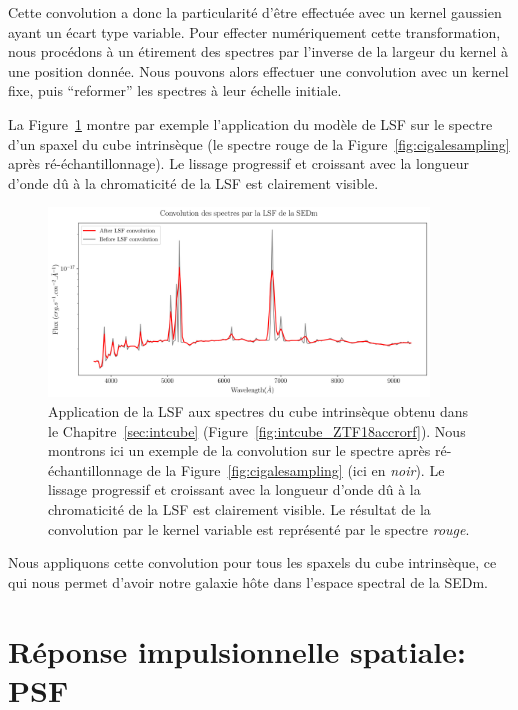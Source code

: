 \documentclass[../main/main.tex]{subfiles}
\begin{document}
Cette convolution a donc la particularité d'être effectuée avec un
kernel gaussien ayant un écart type variable. Pour effecter
numériquement cette
transformation, nous procédons à un
étirement des spectres par l'inverse de la largeur du kernel à une
position donnée. Nous pouvons alors effectuer une convolution avec un
kernel fixe, puis ``reformer'' les spectres à leur échelle initiale.

La Figure~\ref{fig:lsfapplied} montre par exemple l'application du
modèle de LSF sur le spectre d'un spaxel du cube intrinsèque (le spectre
rouge de la Figure~\ref{fig:cigalesampling} après
ré-échantillonnage). Le lissage progressif et croissant avec la
longueur d'onde dû à la chromaticité de la LSF est
clairement visible.

\begin{figure}[h!]
  \centering
  \includegraphics[width=0.9\textwidth]{../figures/06_irf/lsfapplied.png}
  \caption[Application de la LSF]{Application de la LSF aux spectres du
    cube intrinsèque obtenu dans le Chapitre~\ref{sec:intcube}
    (Figure~\ref{fig:intcube_ZTF18accrorf}). Nous montrons ici un exemple
    de la convolution sur le spectre après ré-échantillonnage de la
    Figure~\ref{fig:cigalesampling} (ici en \textit{noir}). Le lissage progressif et croissant avec la
longueur d'onde dû à la chromaticité de la LSF est
clairement visible. Le résultat de la convolution par le kernel variable
est représenté par le spectre \textit{rouge}.}
  \label{fig:lsfapplied}
\end{figure}

Nous appliquons cette convolution pour tous les spaxels du cube
intrinsèque, ce qui nous permet d'avoir notre galaxie hôte dans l'espace
spectral de la SEDm.
\clearpage

\section{Réponse impulsionnelle spatiale: PSF}\label{sec:psf}
\end{document}
